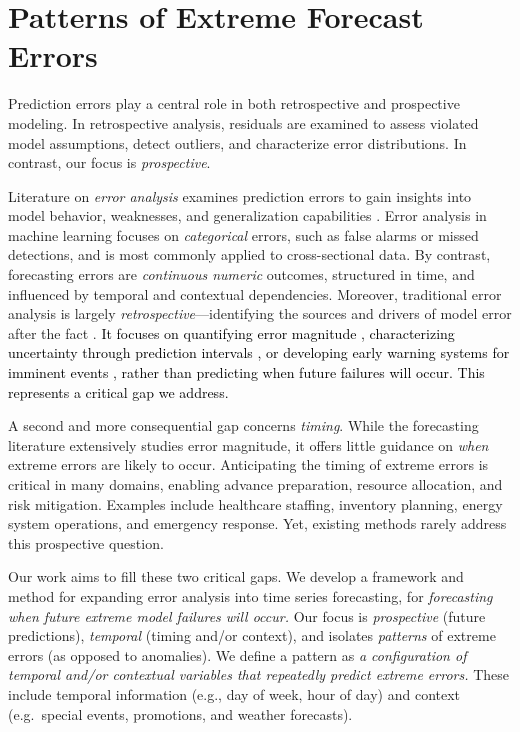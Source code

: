 \documentclass[]{interact}
\theoremstyle{plain}
\theoremstyle{definition}
\theoremstyle{remark}
\newcommand{\matt}[1]{\textcolor{black}{#1}}
\begin{document}
\section{Patterns of Extreme Forecast Errors}
\label{sec:patterns}

Prediction errors play a central role in both retrospective and prospective modeling. In
retrospective analysis, residuals are examined to assess violated model assumptions, detect
outliers, and characterize error distributions. In contrast, our focus is \emph{prospective}.

Literature on \emph{error analysis} examines prediction errors to gain insights into model
behavior, weaknesses, and generalization capabilities \citep{cakmak2024}. Error analysis in
machine learning focuses on \emph{categorical} errors, such as false alarms or missed
detections, and is most commonly applied to cross-sectional data. By contrast, forecasting
errors are \emph{continuous numeric} outcomes, structured in time, and influenced by
temporal and contextual dependencies. Moreover, traditional error analysis is largely
\emph{retrospective}---identifying the sources and drivers of model error after the fact
\citep{cakmak2024}. \matt{It focuses on quantifying error magnitude \citep{kim2020},
characterizing uncertainty through prediction intervals \citep{salem2020}, or developing
early warning systems for imminent events \citep{shmueli2010}, rather than predicting when
future failures will occur. This represents a critical gap we address.}

A second and more consequential gap concerns \emph{timing}. While the forecasting literature
extensively studies error magnitude, it offers little guidance on \emph{when} extreme errors
are likely to occur. Anticipating the timing of extreme errors is critical in many domains,
enabling advance preparation, resource allocation, and risk mitigation. Examples include
healthcare staffing, inventory planning, energy system operations, and emergency response.
Yet, existing methods rarely address this prospective question.

Our work aims to fill these two critical gaps. We develop a framework and method for
expanding error analysis into time series forecasting, for \textit{forecasting when future
extreme model failures will occur.} Our focus is \textit{prospective} (future predictions),
\textit{temporal} (timing and/or context), and isolates \textit{patterns} of extreme errors
(as opposed to anomalies). We define a pattern as \textit{a configuration of temporal and/or
contextual variables that repeatedly predict extreme errors.} These include temporal
information (e.g., day of week, hour of day) and context (e.g.\ special events, promotions,
and weather forecasts).
\end{document}
